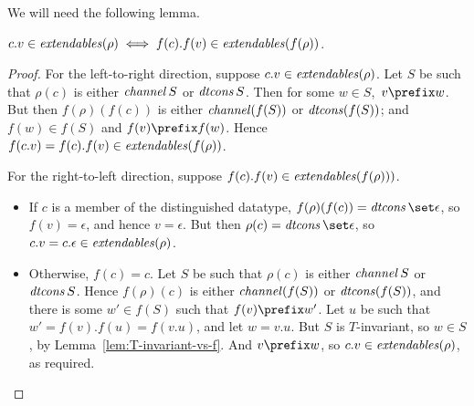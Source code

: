 



We will need the following lemma.
%
\begin{lemma}\label{lem:extendables-f-rho}
$c.v \in \mathop{\it extendables}(\rho) \iff f(c).f(v) \in \mathop{\it extendables}(f(\rho))$.
\end{lemma}

\begin{proof}
For the left-to-right direction, suppose $c.v \in \mathop{\it extendables}(\rho)$.  Let
$S$ be such that $\rho(c)$ is either $\mathop{\it channel} S$ or $\mathop{\it dtcons} S$.  Then for
some $w \in S$,\, $v \prefix w$.  But then $f(\rho)(f(c))$ is either $\mathop{\it channel}
(f(S))$ or $\mathop{\it dtcons} (f(S))$; and $f(w) \in f(S)$ and $f(v) \prefix
f(w)$. Hence $f(c.v) = f(c).f(v) \in \mathop{\it extendables}(f(\rho))$.

For the right-to-left direction, suppose $f(c).f(v) \in
\mathop{\it extendables}(f(\rho)))$.
\begin{itemize}
\item If $c$ is a member of the distinguished datatype, $f(\rho)(f(c)) =
  \dtcons\set\epsilon$, so $f(v) = \epsilon$, and hence $v = \epsilon$.  But
  then $\rho(c) = \dtcons\set\epsilon$, so $c.v = c.\epsilon \in
  \mathop{\it extendables}(\rho)$.

\item Otherwise, $f(c) = c$.  Let $S$ be such that $\rho(c)$ is either
  $\mathop{\it channel} S$ or $\mathop{\it dtcons} S$.  Hence $f(\rho)(c)$ is either $\mathop{\it channel} (f(S))$
  or $\mathop{\it dtcons} (f(S))$, and there is some $w' \in f(S)$ such that $f(v) \prefix
  w'$.  Let $u$ be such that $w' = f(v).f(u) = f(v.u)$, and let $w = v.u$.
  But $S$ is $T$-invariant, so $w \in S$, by Lemma~\ref{lem:T-invariant-vs-f}.
  And $v \prefix w$, so $c.v \in \mathop{\it extendables}(\rho)$, as required.
\end{itemize}
\end{proof}


